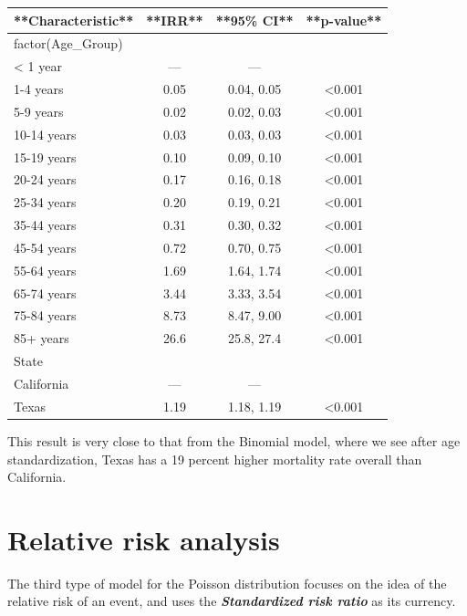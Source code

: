 \documentclass[
  letterpaper,
  DIV=11,
  numbers=noendperiod]{scrreprt}
\begin{document}
\begin{tabular}{l|c|c|c}
\hline
**Characteristic** & **IRR** & **95\% CI** & **p-value**\\
\hline
factor(Age\_Group) &  &  & \\
\hline
< 1 year & — & — & \\
\hline
1-4 years & 0.05 & 0.04, 0.05 & <0.001\\
\hline
5-9 years & 0.02 & 0.02, 0.03 & <0.001\\
\hline
10-14 years & 0.03 & 0.03, 0.03 & <0.001\\
\hline
15-19 years & 0.10 & 0.09, 0.10 & <0.001\\
\hline
20-24 years & 0.17 & 0.16, 0.18 & <0.001\\
\hline
25-34 years & 0.20 & 0.19, 0.21 & <0.001\\
\hline
35-44 years & 0.31 & 0.30, 0.32 & <0.001\\
\hline
45-54 years & 0.72 & 0.70, 0.75 & <0.001\\
\hline
55-64 years & 1.69 & 1.64, 1.74 & <0.001\\
\hline
65-74 years & 3.44 & 3.33, 3.54 & <0.001\\
\hline
75-84 years & 8.73 & 8.47, 9.00 & <0.001\\
\hline
85+ years & 26.6 & 25.8, 27.4 & <0.001\\
\hline
State &  &  & \\
\hline
California & — & — & \\
\hline
Texas & 1.19 & 1.18, 1.19 & <0.001\\
\hline
\end{tabular}

This result is very close to that from the Binomial model, where we see
after age standardization, Texas has a 19 percent higher mortality rate
overall than California.

\hypertarget{relative-risk-analysis}{%
\section{Relative risk analysis}\label{relative-risk-analysis}}

The third type of model for the Poisson distribution focuses on the idea
of the relative risk of an event, and uses the
\textbf{\emph{Standardized risk ratio}} as its currency.
\end{document}
